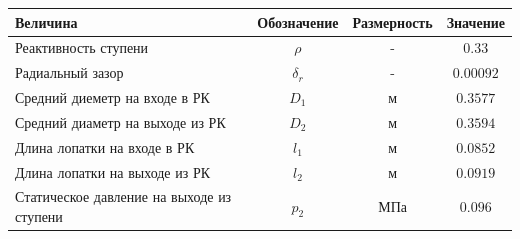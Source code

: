 \documentclass[a4paper,10pt]{article}
\begin{document}
\begin{center}
	\begin{tabular}{|p{7cm}|c|c|c|}
		\hline
		\textbf{Величина} & \textbf{Обозначение} & \textbf{Размерность} & \textbf{Значение} \\ \hline
		Реактивность ступени & $\rho$ & - & $0.33$ \\ \hline
		Радиальный зазор & $\delta_r$ & - & $0.00092$ \\ \hline
		Средний диеметр на входе в РК & $D_1$ & м & $0.3577$ \\ \hline
		Средний диаметр на выходе из РК & $D_2$ & м & $0.3594$ \\ \hline 
		Длина лопатки на входе в РК & $l_1$ & м & $0.0852$ \\ \hline 
		Длина лопатки на выходе из РК & $l_2$ & м & $0.0919$ \\ \hline
		Статическое давление на выходе из ступени & $p_2$ & МПа & $0.096$ \\ \hline
				
	\end{tabular}
\end{center}
\end{document}
